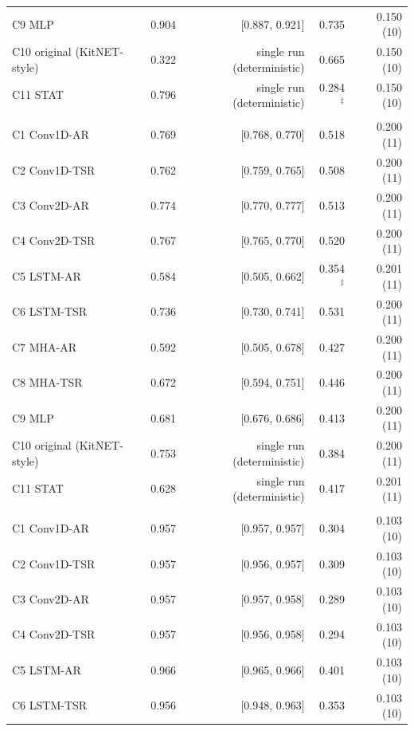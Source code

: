 \begin{longtable}{@{}lrrrr@{}}
\quad C9 MLP & 0.904 & [0.887, 0.921] & 0.735 & 0.150 (10) \\
\quad C10 original (KitNET-style) & 0.322 & single run (deterministic) & 0.665 & 0.150 (10) \\
\quad C11 STAT & 0.796 & single run (deterministic) & 0.284$^{\ddagger}$ & 0.150 (10) \\
\addlinespace
\multicolumn{5}{l}{\textit{KNAD Fuzzing} --- $n=2$ seed(s); prevalence $p=0.235$; $F_{1,\mathrm{trivial}}=0.381$; AUC$_t=0.817$} \\
\quad C1 Conv1D-AR & 0.769 & [0.768, 0.770] & 0.518 & 0.200 (11) \\
\quad C2 Conv1D-TSR & 0.762 & [0.759, 0.765] & 0.508 & 0.200 (11) \\
\quad C3 Conv2D-AR & 0.774 & [0.770, 0.777] & 0.513 & 0.200 (11) \\
\quad C4 Conv2D-TSR & 0.767 & [0.765, 0.770] & 0.520 & 0.200 (11) \\
\quad C5 LSTM-AR & 0.584 & [0.505, 0.662] & 0.354$^{\ddagger}$ & 0.201 (11) \\
\quad C6 LSTM-TSR & 0.736 & [0.730, 0.741] & 0.531 & 0.200 (11) \\
\quad C7 MHA-AR & 0.592 & [0.505, 0.678] & 0.427 & 0.200 (11) \\
\quad C8 MHA-TSR & 0.672 & [0.594, 0.751] & 0.446 & 0.200 (11) \\
\quad C9 MLP & 0.681 & [0.676, 0.686] & 0.413 & 0.200 (11) \\
\quad C10 original (KitNET-style) & 0.753 & single run (deterministic) & 0.384 & 0.200 (11) \\
\quad C11 STAT & 0.628 & single run (deterministic) & 0.417 & 0.201 (11) \\
\addlinespace
\multicolumn{5}{l}{\textit{KNAD OS Scan} --- $n=2$ seed(s); prevalence $p=0.049$; $F_{1,\mathrm{trivial}}=0.093$; AUC$_t=0.791$} \\
\quad C1 Conv1D-AR & 0.957 & [0.957, 0.957] & 0.304 & 0.103 (10) \\
\quad C2 Conv1D-TSR & 0.957 & [0.956, 0.957] & 0.309 & 0.103 (10) \\
\quad C3 Conv2D-AR & 0.957 & [0.957, 0.958] & 0.289 & 0.103 (10) \\
\quad C4 Conv2D-TSR & 0.957 & [0.956, 0.958] & 0.294 & 0.103 (10) \\
\quad C5 LSTM-AR & 0.966 & [0.965, 0.966] & 0.401 & 0.103 (10) \\
\quad C6 LSTM-TSR & 0.956 & [0.948, 0.963] & 0.353 & 0.103 (10) \\

\end{longtable}

